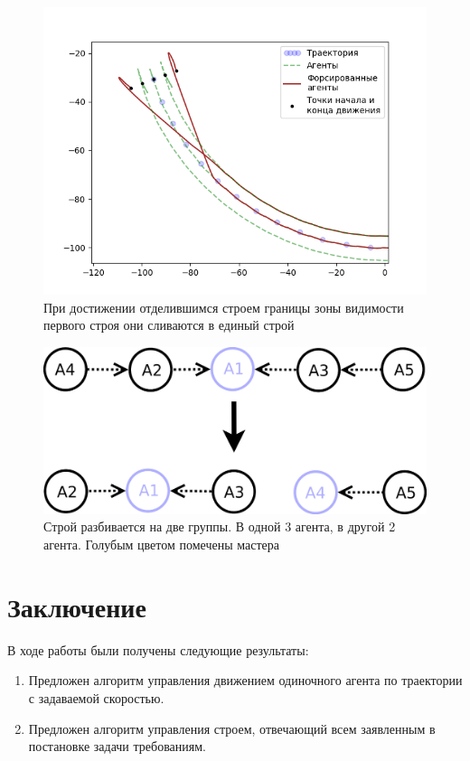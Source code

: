 \documentclass[a4paper, 14pt]{extarticle}
\let\Oldsection\section
\renewcommand{\section}{\FloatBarrier\Oldsection}
\begin{document}
\begin{figure}
	\centering
	\includegraphics[width=0.7\linewidth]{platoon/with-bird-zoom2}
	\caption{При достижении отделившимся строем границы зоны видимости первого строя они сливаются в единый строй}
	\label{fig:with-bird-zoom2}
\end{figure}
\begin{figure}
	\centering
	\includegraphics[width=0.7\linewidth]{platoon/with-bird-to-groups}
	\caption{Строй разбивается на две группы. В одной 3 агента, в другой 2 агента. Голубым цветом помечены мастера}
	\label{fig:with-bird-to-groups}
\end{figure}

%
\section*{Заключение}
В ходе работы были получены следующие результаты:
\begin{enumerate}
	\item Предложен алгоритм управления движением одиночного агента по траектории с задаваемой скоростью.
	\item Предложен алгоритм управления строем, отвечающий всем заявленным в постановке задачи требованиям.
\end{enumerate}

%
\end{document}
